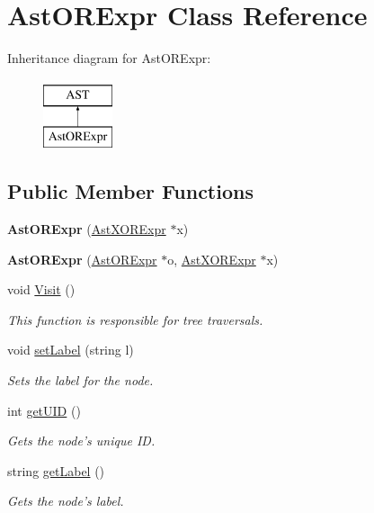 \hypertarget{classAstORExpr}{\section{Ast\-O\-R\-Expr Class Reference}
\label{classAstORExpr}
}
Inheritance diagram for Ast\-O\-R\-Expr\-:\begin{figure}[H]
\begin{center}
\leavevmode
\includegraphics[height=2.000000cm]{classAstORExpr}
\end{center}
\end{figure}
\subsection*{Public Member Functions}
\begin{DoxyCompactItemize}
\item 
\hypertarget{classAstORExpr_a7e7557c1813587fa1a442cb7b5c5317c}{{\bfseries Ast\-O\-R\-Expr} (\hyperlink{classAstXORExpr}{Ast\-X\-O\-R\-Expr} $\ast$x)}\label{classAstORExpr_a7e7557c1813587fa1a442cb7b5c5317c}

\item 
\hypertarget{classAstORExpr_a928d0f31c99cd5d9eef962544465df7e}{{\bfseries Ast\-O\-R\-Expr} (\hyperlink{classAstORExpr}{Ast\-O\-R\-Expr} $\ast$o, \hyperlink{classAstXORExpr}{Ast\-X\-O\-R\-Expr} $\ast$x)}\label{classAstORExpr_a928d0f31c99cd5d9eef962544465df7e}

\item 
void \hyperlink{classAstORExpr_ac442067b01450413dca857727b3af8b3}{Visit} ()
\begin{DoxyCompactList}\small\item\em This function is responsible for tree traversals. \end{DoxyCompactList}\item 
void \hyperlink{classAST_a71d680856e95ff89f55d5311a552eba6}{set\-Label} (string l)
\begin{DoxyCompactList}\small\item\em Sets the label for the node. \end{DoxyCompactList}\item 
int \hyperlink{classAST_ab7a5b1d9f1c2de0d98deb356f724a42c}{get\-U\-I\-D} ()
\begin{DoxyCompactList}\small\item\em Gets the node's unique I\-D. \end{DoxyCompactList}\item 
string \hyperlink{classAST_aee029be902fffc927d16ccb03eb922ad}{get\-Label} ()
\begin{DoxyCompactList}\small\item\em Gets the node's label. \end{DoxyCompactList}\end{DoxyCompactItemize}
